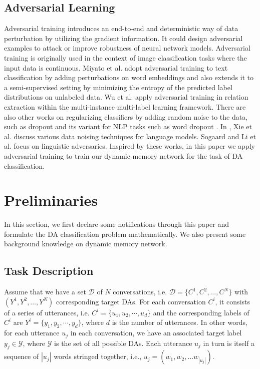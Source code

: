 \documentclass[conference]{IEEEtran}
\begin{document}
	\subsection{Adversarial Learning}
Adversarial training \cite{goodfellow2015explaining} introduces an end-to-end and deterministic way of data perturbation by utilizing the gradient information. It could design adversarial examples to attack \cite{tramer2017ensemble} or improve robustness \cite{ wang2018not, zhang2018layerwise} of neural network models. Adversarial training is originally used in the context of image classiﬁcation tasks where the input data is continuous. Miyato et al. \cite{miyato2016adversarial} adopt adversarial training to text classiﬁcation by adding perturbations on word embeddings and also extends it to a semi-supervised setting by minimizing the entropy of the predicted label distributions on unlabeled data. Wu et al. \cite{wu2017adversarial} apply adversarial training in relation extraction within the multi-instance multi-label learning framework. There are also other works on regularizing classifiers by adding random noise to the data, such as dropout \cite{srivastava2014dropout} and its variant for NLP tasks such as word dropout \cite{iyyer2015deep}. In \cite{xie2017data}, Xie et al. discuss various data noising techniques for language models. Sogaard and Li et al. \cite{li2017robust} focus on linguistic adversaries. Inspired by these works, in this paper we apply adversarial training to train our dynamic memory network for the task of DA classification. 

	\section{Preliminaries}\label{sec_preliminaries}
	In this section, we first declare some notifications through this paper and formulate the DA classification problem mathematically. We also present some background knowledge on dynamic memory network.
	
	\subsection{Task Description}
	Assume that we have a set $\mathcal{D}$ of $N$ conversations, i.e. $\mathcal{D}=\{C^1, C^2, \ldots, C^N\}$ with $(Y^1, Y^2, \ldots, Y^N)$ corresponding target DAs. For each conversation $C^i$, it consists of a series of utterances, i.e. $C^i=\{u_1,u_2,\cdots,u_d\}$ and the corresponding labels of $C^i$ are $Y^i = \{y_1,y_2,\cdots,y_d\}$, where $d$ is the number of utterances. In other words, for each utterance $u_j$ in each conversation, we have an associated target label $y_j \in \mathcal{Y}$, where $\mathcal{Y}$ is the set of all possible DAs. Each utterance $u_j$ in turn is itself a sequence of $|u_j|$ words stringed together, i.e., $u_j = (w_1, w_2, \ldots w_{|u_j|})$.
	
\end{document}
